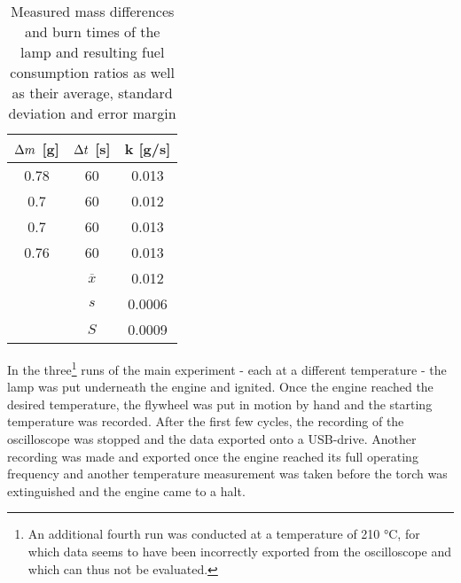 \documentclass[titlepage]{article}
\begin{document}
\begin{table}[H]
    \centering
    \caption{Measured mass differences and burn times of the lamp and resulting fuel consumption ratios as well as their average, standard deviation and error margin}
    \label{tb_consumption_rate}
    \begin{tabular}{|c|c|c|}
        \hline
        \(\adif m\) [g] & \(\adif t\) [s] & k [g/s]
        \\
        \hline
        0.78 & 60 & 0.013
        \\
        \hline
        0.7 & 60 & 0.012
        \\
        \hline
        0.7 & 60 & 0.013
        \\
        \hline
        0.76 & 60 & 0.013
        \\
        \hline
        \hline
        & \(\overline{x}\) & 0.012
        \\
        \hline
        & \(s\) & 0.0006
        \\
        \hline
        & \(S\) & 0.0009
        \\
        \hline
    \end{tabular}
\end{table}

\noindent In the three\footnote{An additional fourth run was conducted at a temperature of 210 °C, for which data seems to have been incorrectly exported from the oscilloscope and which can thus not be evaluated.} runs of the main experiment - each at a different temperature - the lamp was put underneath the engine and ignited. Once the engine reached the desired temperature, the flywheel was put in motion by hand and the starting temperature was recorded. After the first few cycles, the recording of the oscilloscope was stopped and the data exported onto a USB-drive. Another recording was made and exported once the engine reached its full operating frequency and another temperature measurement was taken before the torch was extinguished and the engine came to a halt.
\end{document}
